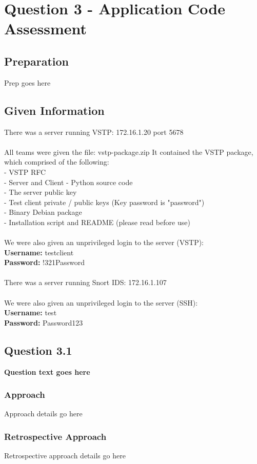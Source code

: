 \chapter{Question 3 - Application Code Assessment}

\section{Preparation}
Prep goes here

\section{Given Information}
There was a server running VSTP: 172.16.1.20 port 5678
\\\\
All teams were given the file: vstp-package.zip
It contained the VSTP package, which comprised of the following:
\\- VSTP RFC
\\- Server and Client - Python source code
\\- The server public key
\\- Test client private / public keys (Key password is "password")
\\- Binary Debian package
\\- Installation script and README (please read before use)
\\\\
We were also given an unprivileged login to the server (VSTP):\\
\textbf{Username:} testclient
\\
\textbf{Password:} !321Password
\\\\
There was a server running Snort IDS: 172.16.1.107
\\\\
We were also given an unprivileged login to the server (SSH):\\
\textbf{Username:} test
\\
\textbf{Password:} Password123

\section{Question 3.1}
\textbf{Question text goes here}
\subsection{Approach}
Approach details go here
\subsection{Retrospective Approach}
Retrospective approach details go here
